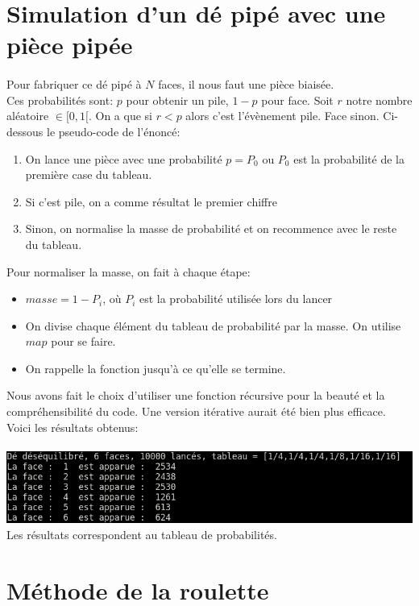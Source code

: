 \documentclass[a4paper, 11pt]{article}
\begin{document}
\section{Simulation d'un dé pipé avec une pièce pipée}
\paragraph{}
Pour fabriquer ce dé pipé à $N$ faces, il nous faut une pièce biaisée.\\
Ces probabilités sont: $p$ pour obtenir un pile, $1-p$ pour face. Soit $r$ notre nombre aléatoire $\in [0,1[$.
On a que si $r < p$ alors c'est l'évènement pile. Face sinon.
Ci-dessous le pseudo-code de l'énoncé:
\begin{enumerate}
 \item On lance une pièce avec une probabilité $p = P_0$ ou $P_0$ est la probabilité de la première case du tableau.
 \item Si c'est pile, on a comme résultat le premier chiffre
 \item Sinon, on normalise la masse de probabilité et on recommence avec le reste du tableau.
\end{enumerate}

Pour normaliser la masse, on fait à chaque étape:
\begin{itemize}
 \item $masse = 1 - P_i$, où $P_i$ est la probabilité utilisée lors du lancer
 \item On divise chaque élément du tableau de probabilité par la masse. On utilise $map$ pour se faire.
 \item On rappelle la fonction jusqu'à ce qu'elle se termine.
\end{itemize}

Nous avons fait le choix d'utiliser une fonction récursive pour la beauté et la compréhensibilité du code. Une version itérative aurait
été bien plus efficace.
Voici les résultats obtenus:
\\
\\
\includegraphics[scale=0.5]{de_pipe_piece}
\\
Les résultats correspondent au tableau de probabilités.

\section{Méthode de la roulette}
\end{document}
